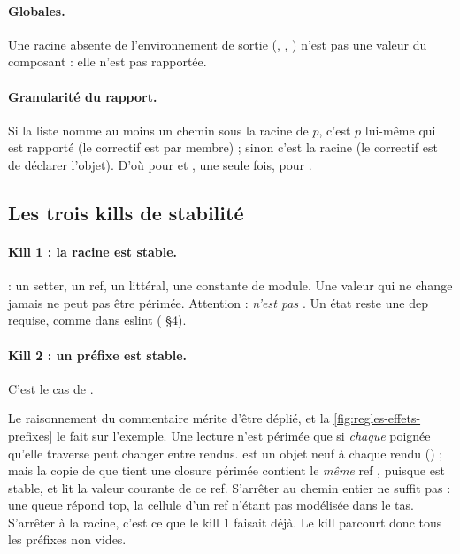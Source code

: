 \paragraph{Globales.} Une racine absente de l'environnement de sortie (, , ) n'est pas une valeur du composant : elle n'est pas rapportée.

\paragraph{Granularité du rapport.} Si la liste nomme au moins un chemin sous la racine de $p$, c'est $p$ lui-même qui est rapporté (le correctif est par membre) ; sinon c'est la racine (le correctif est de déclarer l'objet). D'où  pour  et , une seule fois, pour .

\subsection{Les trois kills de stabilité}

\paragraph{Kill 1 : la racine est stable.}  : un setter, un ref, un littéral, une constante de module. Une valeur qui ne change jamais ne peut pas être périmée. Attention :  \emph{n'est pas} . Un état reste une dep requise, comme dans eslint ( §4).

\paragraph{Kill 2 : un préfixe est stable.} C'est le cas de .


Le raisonnement du commentaire mérite d'être déplié, et la \cref{fig:regles-effets-prefixes} le fait sur l'exemple. Une lecture n'est périmée que si \emph{chaque} poignée qu'elle traverse peut changer entre rendus.  est un objet neuf à chaque rendu () ; mais la copie de  que tient une closure périmée contient le \emph{même} ref , puisque  est stable, et  lit la valeur courante de ce ref. S'arrêter au chemin entier ne suffit pas : une queue  répond top, la cellule d'un ref n'étant pas modélisée dans le tas. S'arrêter à la racine, c'est ce que le kill 1 faisait déjà. Le kill parcourt donc tous les préfixes non vides.

